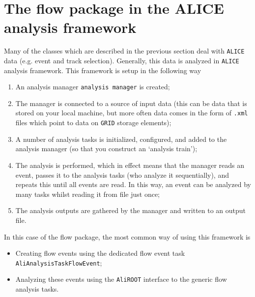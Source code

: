 \documentclass[a4paper]{book}
\numberwithin{equation}{subsection}
\begin{document}
\section{The flow package in the ALICE analysis framework}
Many of the classes which are described in the previous section deal with \texttt{ALICE} data (e.g. event and track selection). Generally, this data is analyzed in \texttt{ALICE} analysis framework. This framework is setup in the following way
\begin{enumerate}
\item An analysis manager \texttt{analysis manager} is created; 
\item The manager is connected to a source of input data (this can be data that is stored on your local machine, but more often data comes in the form of \texttt{.xml} files which point to data on \texttt{GRID} storage elements);
\item A number of analysis tasks is initialized, configured, and added to the analysis manager (so that you construct an `analysis train');
\item The analysis is performed, which in effect means that the manager reads an event, passes it to the analysis tasks (who analyze it sequentially), and repeats this until all events are read. In this way, an event can be analyzed by many tasks whilst reading it from file just once;
\item The analysis outputs are gathered by the manager and written to an output file.
\end{enumerate}
In this case of the flow package, the most common way of using this framework is 
\begin{itemize}
\item Creating flow events using the dedicated flow event task \texttt{AliAnalysisTaskFlowEvent};
\item Analyzing these events using the \texttt{AliROOT} interface to the generic flow analysis tasks. 
\end{itemize}
\end{document}
